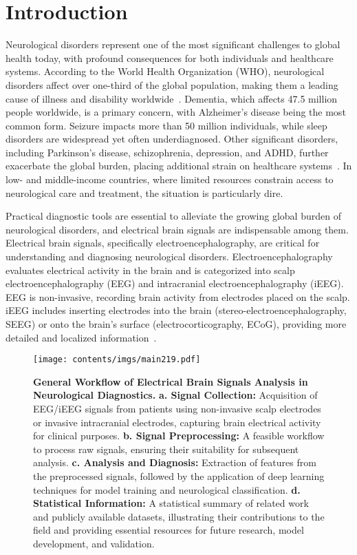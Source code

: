 \section{Introduction}
\label{sec:introduction}
Neurological disorders represent one of the most significant challenges to global health today, with profound consequences for both individuals and healthcare systems.
According to the World Health Organization (WHO), neurological disorders affect over one-third of the global population, making them a leading cause of illness and disability  worldwide~\cite{WHO2024}.
Dementia, which affects 47.5 million people worldwide, is a primary concern, with Alzheimer's disease being the most common form. Seizure impacts more than 50 million individuals, while sleep disorders are widespread yet often underdiagnosed. Other significant disorders, including Parkinson's disease, schizophrenia, depression, and ADHD, further exacerbate the global burden, placing additional strain on healthcare systems~\cite{WHO_MentalHealth}.
In low- and middle-income countries, where limited resources constrain access to neurological care and treatment, the situation is particularly dire.

Practical diagnostic tools are essential to alleviate the growing global burden of neurological disorders, and electrical brain signals are indispensable among them.
Electrical brain signals, specifically electroencephalography, are critical for understanding and diagnosing neurological disorders. 
Electroencephalography evaluates electrical activity in the brain and is categorized into scalp electroencephalography (EEG) and intracranial electroencephalography (iEEG). 
EEG is non-invasive, recording brain activity from electrodes placed on the scalp. 
iEEG includes inserting electrodes into the brain (stereo-electroencephalography, SEEG) or onto the brain's surface (electrocorticography, ECoG), providing more detailed and localized information~\cite{ramantani2016correlation}.

\begin{figure*}[t] %
    \centering
    \texttt{[image: contents/imgs/main219.pdf]} %
  \caption{\textbf{General Workflow of Electrical Brain Signals Analysis in Neurological Diagnostics.} \textbf{a. Signal Collection:} Acquisition of EEG/iEEG signals from patients using non-invasive scalp electrodes or invasive intracranial electrodes, capturing brain electrical activity for clinical purposes. \textbf{b. Signal Preprocessing:} A feasible workflow to process raw signals, ensuring their suitability for subsequent analysis.  \textbf{c. Analysis and Diagnosis:} Extraction of features from the preprocessed signals, followed by the application of deep learning techniques for model training and neurological classification. \newline \textbf{d. Statistical Information:} A statistical summary of related work and publicly available datasets, illustrating their contributions to the field and providing essential resources for future research, model development, and validation.}
    \label{fig:main}
\end{figure*}


